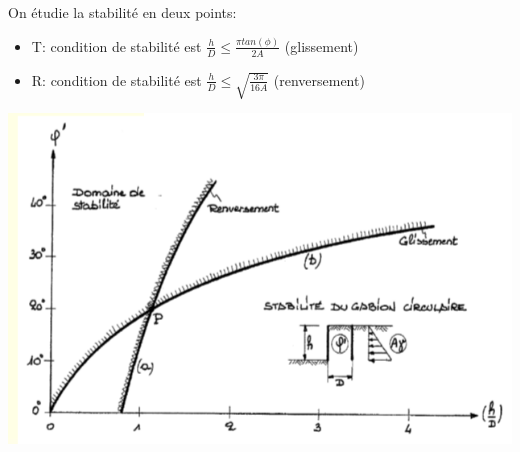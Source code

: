 On étudie la stabilité en deux points: 
\begin{itemize}
    \item T: condition de stabilité est $\frac{h}{D} \leq \frac{\pi tan(\phi)}{2A}$ (glissement)
    \item R: condition de stabilité est $\frac{h}{D} \leq \sqrt{\frac{3 \pi}{16 A}}$ (renversement)
\end{itemize}

\begin{center}
\includegraphics [scale=0.8]{pictures/158.PNG}
\end{center}
